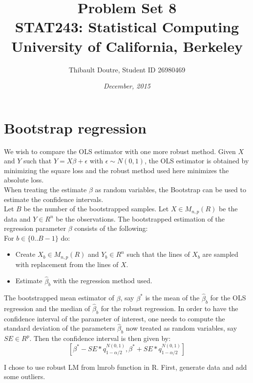 \documentclass[11pt]{article}\usepackage[]{graphicx}\usepackage[]{color}
\author{Thibault Doutre, Student ID 26980469}
\title{Problem Set 8\\ STAT243: Statistical Computing\\
University of California, Berkeley}
\date{\textit{December, 2015}}
\begin{document}
\maketitle

\section{Bootstrap regression}
We wish to compare the OLS estimator with one more robust method. Given $X$ and $Y$ such that $Y=X\beta+\epsilon$ with $\epsilon \sim N(0,1)$, the OLS estimator is obtained by minimizing the square loss and the robust method used here minimizes the absolute loss.\\
When treating the estimate $\beta$ as random variables, the Bootstrap can be used to estimate the confidence intervals.\\

\noindent
Let $B$ be the number of the bootstrapped samples. Let $X \in M_{n,p}(R)$ be the data and $Y \in R^n$ be the observations. The bootstrapped estimation of the regression parameter $\beta$ consists of the following:\\

For $b \in \{0..B-1\}$ do:
\begin{itemize}
\item Create $X_b \in M_{n,p}(R)$ and $Y_b \in R^{n}$ such that the lines of $X_b$ are sampled with replacement from the lines of $X$.
\item Estimate $\hat{\beta}_b$ with the regression method used.
\end{itemize}

\noindent
The bootstrapped mean estimator of $\beta$, say $\beta^*$ is the mean of the $\hat{\beta}_b$ for the OLS regression and the median of $\hat{\beta}_b$ for the robust regression. In order to have the confidence interval of the parameter of interest, one needs to compute the standard deviation of the parameters $\hat{\beta}_b$ now treated as random variables, say $SE \in R^p$. Then the confidence interval is then given by:
\begin{equation}
\left[\beta^*-SE*q_{1-\alpha/2}^{N(0,1)},\beta^*+SE*q_{1-\alpha/2}^{N(0,1)}\right]
\end{equation}

I chose to use robust LM from lmrob function in R. First, generate data and add some outliers.
\end{document}
